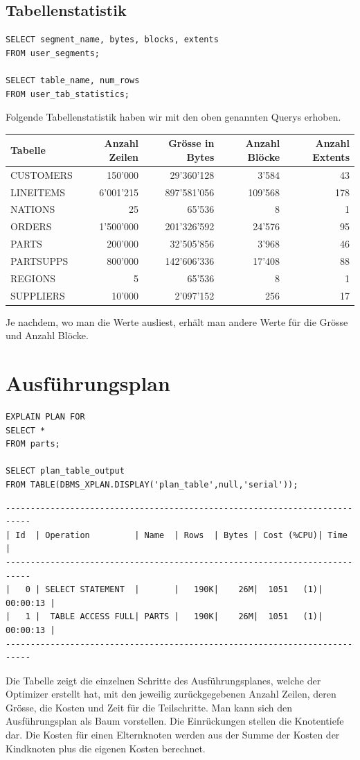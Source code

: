 \documentclass[10pt]{article}
\begin{document}
\subsection{Tabellenstatistik}
\begin{lstlisting}[style=sql]
SELECT segment_name, bytes, blocks, extents
FROM user_segments;

SELECT table_name, num_rows
FROM user_tab_statistics;
\end{lstlisting}
Folgende Tabellenstatistik haben wir mit den oben genannten Querys erhoben.

\begin{tabular}{l||r|r|r|r}
  Tabelle & Anzahl Zeilen & Grösse in Bytes & Anzahl Blöcke & Anzahl Extents \\ \hline
  \hline
  CUSTOMERS & 150'000 & 29'360'128 & 3'584 & 43 \\ \hline
  LINEITEMS & 6'001'215 & 897'581'056 & 109'568 & 178 \\ \hline
  NATIONS & 25 & 65'536 & 8 & 1 \\ \hline
  ORDERS & 1'500'000 & 201'326'592 & 24'576 & 95 \\ \hline
  PARTS & 200'000 & 32'505'856 & 3'968 & 46 \\ \hline
  PARTSUPPS & 800'000 & 142'606'336 & 17'408 & 88 \\ \hline
  REGIONS & 5 & 65'536 & 8 & 1 \\ \hline
  SUPPLIERS & 10'000 & 2'097'152 & 256 & 17 \\
\end{tabular}	

Je nachdem, wo man die Werte ausliest, erhält man andere Werte für die Grösse und 
Anzahl Blöcke.

\newpage
\section{Ausführungsplan}
\begin{lstlisting}[style=sql]
EXPLAIN PLAN FOR
SELECT *
FROM parts;

SELECT plan_table_output
FROM TABLE(DBMS_XPLAN.DISPLAY('plan_table',null,'serial'));
\end{lstlisting}
\begin{lstlisting}[style=queryexecutionplan]
---------------------------------------------------------------------------
| Id  | Operation         | Name  | Rows  | Bytes | Cost (%CPU)| Time     |
---------------------------------------------------------------------------
|   0 | SELECT STATEMENT  |       |   190K|    26M|  1051   (1)| 00:00:13 |
|   1 |  TABLE ACCESS FULL| PARTS |   190K|    26M|  1051   (1)| 00:00:13 |
---------------------------------------------------------------------------
\end{lstlisting}
Die Tabelle zeigt die einzelnen Schritte des Ausführungsplanes, welche der 
Optimizer erstellt hat, mit den jeweilig zurückgegebenen Anzahl Zeilen, deren 
Grösse, die Kosten und Zeit für die Teilschritte. Man kann sich den 
Ausführungsplan als Baum vorstellen. Die Einrückungen stellen die Knotentiefe 
dar. Die Kosten für einen Elternknoten werden aus der Summe der Kosten der 
Kindknoten plus die eigenen Kosten berechnet.
\end{document}
